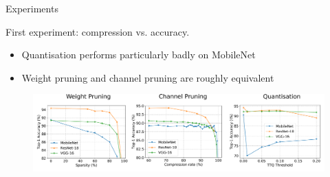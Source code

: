 \documentclass[xcolor=dvipsnames]{beamer}
\begin{document}
\begin{frame}{Experiments}

First experiment: compression vs. accuracy.
\vspace{0.5cm}
\begin{itemize}
    \item Quantisation performs particularly badly on MobileNet
    \item Weight pruning and channel pruning are roughly equivalent 
\end{itemize}
    
\vspace{0.5cm}
\begin{figure}
    \centering
    \includegraphics[width=\linewidth]{images/accuracies.pdf}
\end{figure}
    
\end{frame}









{ %
    \begin{frame}[plain]
     \end{frame}
}
\end{document}
